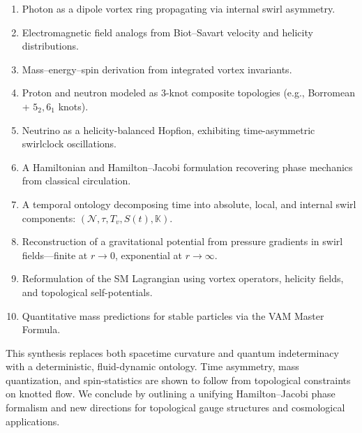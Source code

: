 \begin{enumerate}
    \item Photon as a dipole vortex ring propagating via internal swirl asymmetry.
    \item Electromagnetic field analogs from Biot–Savart velocity and helicity distributions.
    \item Mass–energy–spin derivation from integrated vortex invariants.
    \item Proton and neutron modeled as 3-knot composite topologies (e.g., Borromean + \( 5_2, 6_1 \) knots).
    \item Neutrino as a helicity-balanced Hopfion, exhibiting time-asymmetric swirlclock oscillations.
    \item A Hamiltonian and Hamilton–Jacobi formulation recovering phase mechanics from classical circulation.
    \item A temporal ontology decomposing time into absolute, local, and internal swirl components: \( (\mathcal{N}, \tau, T_v, S(t), \mathbb{K}) \).
    \item Reconstruction of a gravitational potential from pressure gradients in swirl fields—finite at \( r \to 0 \), exponential at \( r \to \infty \).
    \item Reformulation of the SM Lagrangian using vortex operators, helicity fields, and topological self-potentials.
    \item Quantitative mass predictions for stable particles via the VAM Master Formula.
\end{enumerate}

This synthesis replaces both spacetime curvature and quantum indeterminacy with a deterministic, fluid-dynamic ontology. Time asymmetry, mass quantization, and spin-statistics are shown to follow from topological constraints on knotted flow. We conclude by outlining a unifying Hamilton–Jacobi phase formalism and new directions for topological gauge structures and cosmological applications.
